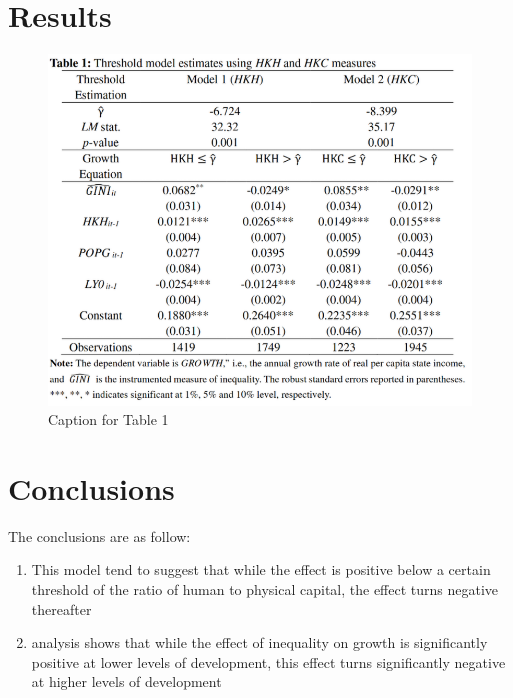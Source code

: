 \documentclass[10pt, oneside]{article}
\begin{document}
\section{Results}
\begin{figure}[h]  %
	\centering
	\includegraphics[width=\textwidth]{table_1.png}  %
	\caption{Caption for Table 1}
\end{figure}


\section{Conclusions}
The conclusions are as follow:
\begin{enumerate}
	\item This model tend to suggest that while the effect is positive below
	      a certain threshold of the ratio of human to physical capital,
	      the effect turns negative thereafter
	\item analysis shows that while the effect of inequality on growth is significantly positive at
	      lower levels of development, this effect turns significantly negative at higher levels of
	      development
\end{enumerate}
\cite{ccepni2020threshold}
\printbibliography
\end{document}
